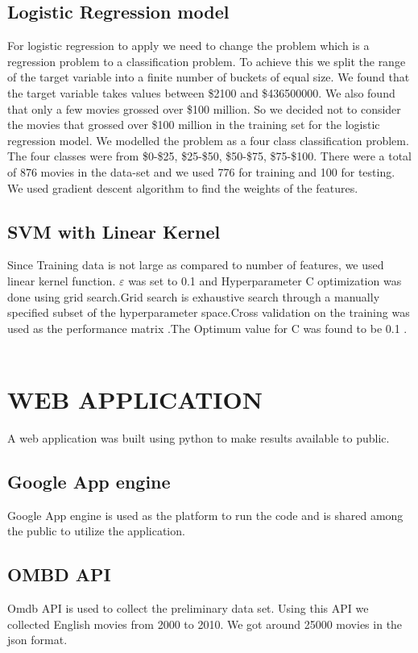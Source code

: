 \subsection {Logistic Regression model}
   For logistic regression to apply we need to change the problem which is a regression problem to a classification problem. To achieve this we split the range of the target variable into a finite number of buckets of equal size. We found that the target variable takes values between \$2100 and \$436500000. We also found that only a few movies grossed over \$100 million. So we decided not to consider the movies that grossed over  \$100 million in the training set for the logistic regression model. We modelled the problem as a four class classification problem. The four classes were from \$0-\$25, \$25-\$50, \$50-\$75, \$75-\$100. There were a total of 876 movies in the data-set and we used 776 for training and 100 for testing. We used gradient descent algorithm to find the weights of the features.
\subsection {SVM with Linear Kernel}
Since Training data is not large as compared to number of features, we used linear kernel function. $\varepsilon$ was set to 0.1 and Hyperparameter C optimization was done using grid search.Grid search is exhaustive search through a manually specified subset of the hyperparameter space.Cross validation on the training was used as the performance matrix .The Optimum value for C was found to be 0.1 .
\\
\\

\section{WEB APPLICATION}
A web application was built using python to make results available to public.
\subsection {Google App engine}
Google App engine is used as the platform to run the code and is shared among the public to utilize the application.
\subsection {OMBD API}
Omdb API is used to collect the preliminary data set. Using this API we collected English movies from 2000 to 2010. We got around 25000 movies in the json format.

